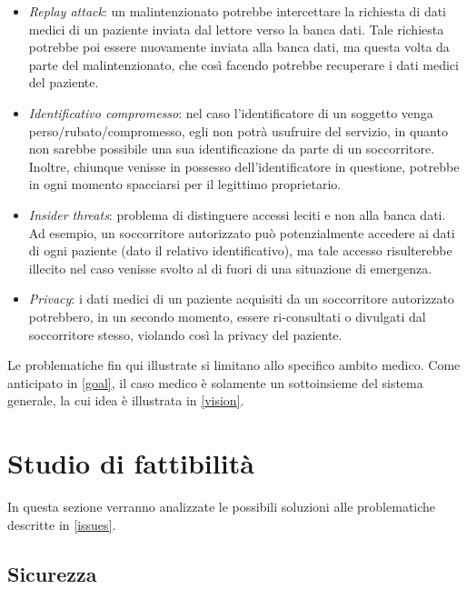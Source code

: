 \documentclass[a4paper,12pt]{report}
\begin{document}
\begin{description}
\begin{itemize}
		\item \emph{Replay attack}: un malintenzionato potrebbe intercettare la richiesta di dati medici di un paziente inviata dal lettore verso la banca dati. Tale richiesta potrebbe poi essere nuovamente inviata alla banca dati, ma questa volta da parte del malintenzionato, che così facendo potrebbe recuperare i dati medici del paziente.
		\item \emph{Identificativo compromesso}: nel caso l'identificatore di un soggetto venga perso/rubato/compromesso, egli non potrà usufruire del servizio, in quanto non sarebbe possibile una sua identificazione da parte di un soccorritore. Inoltre, chiunque venisse in possesso dell'identificatore in questione, potrebbe in ogni momento spacciarsi per il legittimo proprietario.
		\item \emph{Insider threats}: problema di distinguere accessi leciti e non alla banca dati. Ad esempio, un soccorritore autorizzato può potenzialmente accedere ai dati di ogni paziente (dato il relativo identificativo), ma tale accesso risulterebbe illecito nel caso venisse svolto al di fuori di una situazione di emergenza.
		\item \emph{Privacy}: i dati medici di un paziente acquisiti da un soccorritore autorizzato potrebbero, in un secondo momento, essere ri-consultati o divulgati dal soccorritore stesso, violando così la privacy del paziente.
	\end{itemize} 
\end{description}
Le problematiche fin qui illustrate si limitano allo specifico ambito medico. Come anticipato in \autoref{goal}, il caso medico è solamente un sottoinsieme del sistema generale, la cui idea è illustrata in \autoref{vision}. 

\section{Studio di fattibilità} \label{feasibility}

In questa sezione verranno analizzate le possibili soluzioni alle problematiche descritte in \autoref{issues}.

\subsection{Sicurezza}\label{security_issues}
\end{document}
